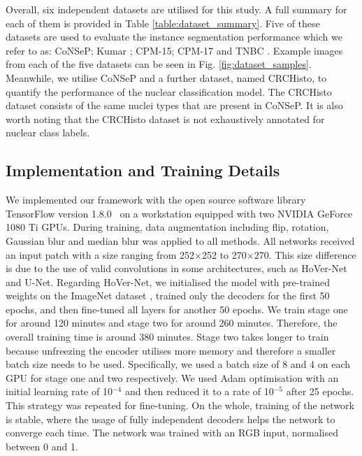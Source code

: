 \documentclass[journal]{IEEEtran}
\begin{document}
    Overall, six independent datasets are utilised for this study. A full summary for each of them is provided in Table \ref{table:dataset_summary}. Five of these datasets are used to evaluate the instance segmentation performance which we refer to as: CoNSeP; Kumar \cite{kumar}; CPM-15; CPM-17 \cite{vu2018methods} and TNBC \cite{naylor2018segmentation}. Example images from each of the five datasets can be seen in Fig. \ref{fig:dataset_samples}. Meanwhile, we utilise CoNSeP and a further dataset, named CRCHisto, to quantify the performance of the nuclear classification model. The CRCHisto dataset consists of the same nuclei types that are present in CoNSeP. It is also worth noting that the CRCHisto dataset is not exhaustively annotated for nuclear class labels. 

	\subsection{Implementation and Training Details} \label{section:implementation}
	We implemented our framework with the open source software library TensorFlow version 1.8.0~\cite{abadi2016tensorflow} on a workstation equipped with two NVIDIA GeForce 1080 Ti GPUs. During training, data augmentation including flip, rotation, Gaussian blur and median blur was applied to all methods. All networks received an input patch with a size ranging from 252$\times$252 to 270$\times$270. This size difference is due to the use of valid convolutions in some architectures, such as HoVer-Net and U-Net. Regarding HoVer-Net, we initialised the model with pre-trained weights on the ImageNet dataset \cite{imagenet_cvpr09}, trained only the decoders for the first 50 epochs, and then fine-tuned all layers for another 50 epochs. We train stage one for around 120 minutes and stage two for around 260 minutes. Therefore, the overall training time is around 380 minutes. Stage two takes longer to train because unfreezing the encoder utilises more memory and therefore a smaller batch size needs to be used. Specifically, we used a batch size of 8 and 4 on each GPU for stage one and two respectively. We used Adam optimisation with an initial learning rate of 10$^{-4}$ and then reduced it to a rate of 10$^{-5}$ after 25 epochs. This strategy was repeated for fine-tuning. On the whole, training of the network is stable, where the usage of fully independent decoders helps the network to converge each time. The network was trained with an RGB input, normalised between 0 and 1.
	
\end{document}
